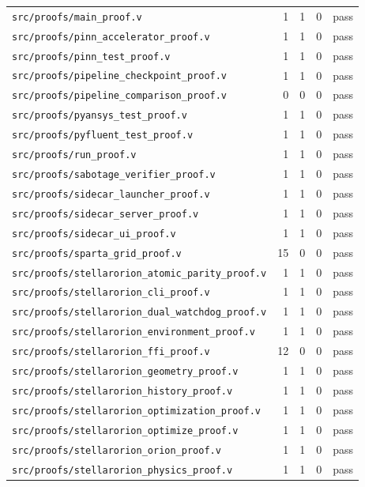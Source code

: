 \documentclass[11pt]{article}
\theoremstyle{definition}
\begin{document}
\begin{longtable}{@{}lrrrl@{}}
\texttt{src/proofs/main\_proof.v} & 1 & 1 & 0 & pass \\
\texttt{src/proofs/pinn\_accelerator\_proof.v} & 1 & 1 & 0 & pass \\
\texttt{src/proofs/pinn\_test\_proof.v} & 1 & 1 & 0 & pass \\
\texttt{src/proofs/pipeline\_checkpoint\_proof.v} & 1 & 1 & 0 & pass \\
\texttt{src/proofs/pipeline\_comparison\_proof.v} & 0 & 0 & 0 & pass \\
\texttt{src/proofs/pyansys\_test\_proof.v} & 1 & 1 & 0 & pass \\
\texttt{src/proofs/pyfluent\_test\_proof.v} & 1 & 1 & 0 & pass \\
\texttt{src/proofs/run\_proof.v} & 1 & 1 & 0 & pass \\
\texttt{src/proofs/sabotage\_verifier\_proof.v} & 1 & 1 & 0 & pass \\
\texttt{src/proofs/sidecar\_launcher\_proof.v} & 1 & 1 & 0 & pass \\
\texttt{src/proofs/sidecar\_server\_proof.v} & 1 & 1 & 0 & pass \\
\texttt{src/proofs/sidecar\_ui\_proof.v} & 1 & 1 & 0 & pass \\
\texttt{src/proofs/sparta\_grid\_proof.v} & 15 & 0 & 0 & pass \\
\texttt{src/proofs/stellarorion\_atomic\_parity\_proof.v} & 1 & 1 & 0 & pass \\
\texttt{src/proofs/stellarorion\_cli\_proof.v} & 1 & 1 & 0 & pass \\
\texttt{src/proofs/stellarorion\_dual\_watchdog\_proof.v} & 1 & 1 & 0 & pass \\
\texttt{src/proofs/stellarorion\_environment\_proof.v} & 1 & 1 & 0 & pass \\
\texttt{src/proofs/stellarorion\_ffi\_proof.v} & 12 & 0 & 0 & pass \\
\texttt{src/proofs/stellarorion\_geometry\_proof.v} & 1 & 1 & 0 & pass \\
\texttt{src/proofs/stellarorion\_history\_proof.v} & 1 & 1 & 0 & pass \\
\texttt{src/proofs/stellarorion\_optimization\_proof.v} & 1 & 1 & 0 & pass \\
\texttt{src/proofs/stellarorion\_optimize\_proof.v} & 1 & 1 & 0 & pass \\
\texttt{src/proofs/stellarorion\_orion\_proof.v} & 1 & 1 & 0 & pass \\
\texttt{src/proofs/stellarorion\_physics\_proof.v} & 1 & 1 & 0 & pass \\

\end{longtable}
\end{document}
